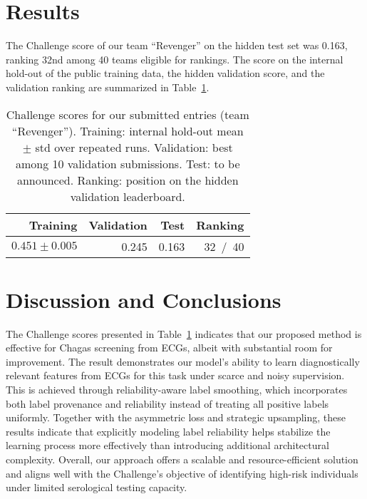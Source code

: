 \documentclass[twocolumn]{cinc}
\begin{document}
\section{Results}
\label{sec:results}


The Challenge score of our team ``Revenger'' on the hidden test set was 0.163, ranking 32nd among 40 teams eligible for rankings. The score on the internal hold-out of the public training data, the hidden validation score, and the validation ranking are summarized in Table~\ref{tab:scores}.

\begin{table}[!htp]
\centering
% 
\begin{tabular}{r|r|r|r}
Training          & Validation & Test & Ranking   \\ \hline
$0.451 \pm 0.005$ & 0.245      & 0.163  & 32~/~40 \\ \hline
\end{tabular}

\caption{Challenge scores for our submitted entries (team ``Revenger''). Training: internal hold-out mean $\pm$ std over repeated runs. Validation: best among 10 validation submissions. Test: to be announced. Ranking: position on the hidden validation leaderboard.}
\label{tab:scores}
\end{table}


\section{Discussion and Conclusions}
\label{sec:discu}


The Challenge scores presented in Table~\ref{tab:scores} indicates that our proposed method is effective for Chagas screening from ECGs, albeit with substantial room for improvement. The result demonstrates our model's ability to learn diagnostically relevant features from ECGs for this task under scarce and noisy supervision. This is achieved through reliability-aware label smoothing, which incorporates both label provenance and reliability instead of treating all positive labels uniformly. Together with the asymmetric loss and strategic upsampling, these results indicate that explicitly modeling label reliability helps stabilize the learning process more effectively than introducing additional architectural complexity. Overall, our approach offers a scalable and resource-efficient solution and aligns well with the Challenge's objective of identifying high-risk individuals under limited serological testing capacity.
\end{document}
